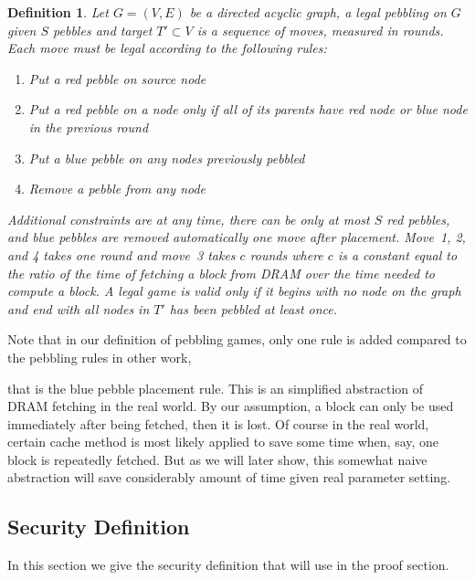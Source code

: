 \documentclass[a4paper]{article}
\newtheorem{definition}{Definition}
\begin{document}
\begin{definition}\label{def::dramPebblingRules}
  Let $G = (V, E)$ be a directed acyclic graph, a legal pebbling on $G$ given $S$ pebbles and target $T\prime \subset V$
  is a sequence of moves, measured in rounds.
  Each move must be legal according to the following rules:

  \begin{enumerate}
    \item Put a red pebble on source node
    \item Put a red pebble on a node only if all of its parents have red node or blue node in the previous round
    \item Put a blue pebble on any nodes previously pebbled
    \item Remove a pebble from any node
  \end{enumerate}

  Additional constraints are at any time, there can be only at most $S$ red pebbles, and blue pebbles are removed automatically one move
  after placement. Move~1, 2, and 4 takes one round and move~3 takes $c$ rounds where $c$ is a constant equal to the ratio of the time of
  fetching a block from DRAM over the time needed to compute a block.
  A legal game is valid only if it begins with no node on the graph and end with all nodes in $T\prime$ has been pebbled at least once.
\end{definition}

Note that in our definition of pebbling games, only one rule is added compared to the pebbling rules in other work,

that is the blue pebble placement rule. This is an simplified abstraction of DRAM fetching in the real world. By our assumption, a block
can only be used immediately after being fetched, then it is lost. Of course in the real world, certain cache method is most likely applied
to save some time when, say, one block is repeatedly fetched. But as we will later show, this somewhat naive abstraction will save considerably
amount of time given real parameter setting.

\subsection{Security Definition}\label{subsec::secDef}

In this section we give the security definition that will use in the proof section.
\end{document}
